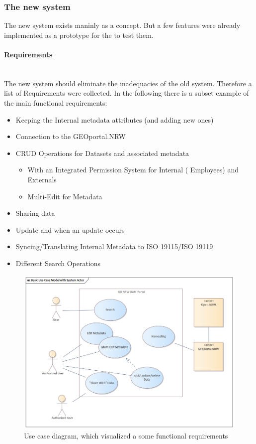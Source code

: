 \documentclass[11pt, titlepage, a4paper]{article}
\newcommand{\myparagraph}[1]{\paragraph{#1}\mbox{}\\}
\begin{document}
\subsubsection{The new system}
The new system exists maninly as a concept. But a few features were already implemented as a prototype for the  to test them.
\myparagraph{Requirements}
The new system should eliminate the inadequacies of the old system. Therefore a list of Requirements were collected. In the following there is a subset example of the main functional requirements:
\begin{itemize}
	\item Keeping the Internal metadata attributes (and adding new ones)
	\item Connection to the GEOportal.NRW
	\item CRUD Operations for Datasets and associated metadata
	      \begin{itemize}
		      \item With an Integrated Permission System for Internal ( Employees) and Externals
		      \item Multi-Edit for Metadata
	      \end{itemize}
	\item Sharing data
	\item Update  and  when an update occurs
	\item Syncing/Translating Internal Metadata to ISO 19115/ISO 19119
	\item Different Search Operations
\end{itemize}


\begin{figure}[t]
	\caption{Use case diagram, which visualized a some functional requirements}
	\label{fig:usecase}
	\includegraphics[width=16cm]{usecase_diagramm.png}
	\centering
\end{figure}
\end{document}
